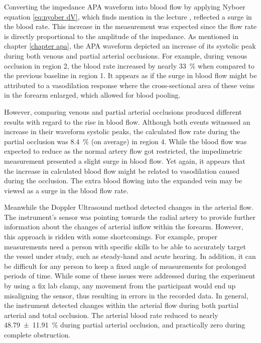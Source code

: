 Converting the impedance APA waveform into blood flow by applying Nyboer equation \ref{eq:nyober dV}, which finds mention in the lecture \cite{costeloe1980continuous, yamakoshi1980limb, porter1985measurement, corciova2011peripheral, brown1975impedance, marks1985computer}, reflected a surge in the blood rate. This increase in the measurement was expected since the flow rate is directly proportional to the amplitude of the impedance. As mentioned in chapter \ref{chapter apa}, the APA waveform depicted an increase of its systolic peak during both venous and partial arterial occlusions. For example, during venous occlusion in region 2, the blood rate increased by nearly \SI{33}{\percent} when compared to the previous baseline in region 1. It appears as if the surge in blood flow might be attributed to a vasodilation response where the cross-sectional area of these veins in the forearm enlarged, which allowed for blood pooling. 

However, comparing venous and partial arterial occlusions produced different results with regard to the rise in blood flow. Although both events witnessed an increase in their waveform systolic peaks, the calculated flow rate during the partial occlusion was \SI{8.4}{\percent} (on average) in region 4. While the blood flow was expected to reduce as the normal artery flow got restricted, the impedimetric measurement presented a slight surge in blood flow. Yet again, it appears that the increase in calculated blood flow might be related to vasodilation caused during the occlusion. The extra blood flowing into the expanded vein may be viewed as a surge in the blood flow rate.

Meanwhile the Doppler Ultrasound method detected changes in the arterial flow. The instrument's sensor was pointing towards the radial artery to provide further information about the changes of arterial inflow within the forearm. However, this approach is ridden with some shortcomings. For example, proper measurements need a person with specific skills to be able to accurately target the vessel under study, such as steady-hand and acute hearing. In addition, it can be difficult for any person to keep a fixed angle of measurements for prolonged periods of time. While some of these issues were addressed during the experiment by using a fix lab clamp, any movement from the participant would end up misaligning the sensor, thus resulting in errors in the recorded data. In general, the instrument detected changes within the arterial flow during both partial arterial and total occlusion. The arterial blood rate reduced to nearly \SI{48.79(1191)}{\percent} during partial arterial occlusion, and practically zero during complete obstruction.

